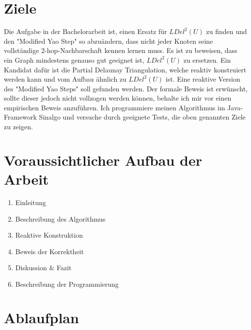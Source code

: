 \documentclass[a4paper,DIV10,10pt,headsepline,smallheadings]{scrreprt}
\begin{document}
\section{Ziele}
Die Aufgabe in der Bachelorarbeit ist, einen Ersatz für $LDel^2(U) $ zu finden und den "Modified Yao Step" so abzuändern, dass nicht jeder Knoten seine vollständige 2-hop-Nachbarschaft kennen lernen muss.
Es ist zu beweisen, dass ein Graph mindestens genauso gut geeignet ist, $LDel^2(U) $ zu ersetzen.
Ein Kandidat dafür ist die Partial Delaunay Triangulation, welche reaktiv konstruiert werden kann und vom Aufbau ähnlich zu $LDel^2(U) $ ist.
Eine reaktive Version des "Modified Yao Steps" soll gefunden werden.
Der formale Beweis ist erwünscht, sollte dieser jedoch nicht vollzogen werden können, behalte ich mir vor einen empirischen Beweis anzuführen.
Ich programmiere meinen Algorithmus im Java-Framework Sinalgo und versuche durch geeignete Tests, die oben genannten Ziele zu zeigen.

\section{Voraussichtlicher Aufbau der Arbeit}
\begin{enumerate}[topsep=0pt,itemsep=-1ex,partopsep=1ex,parsep=1ex]
\item Einleitung
\item Beschreibung des Algorithmus
\item Reaktive Konstruktion
\item Beweis der Korrektheit
\item Diskussion \& Fazit
\item Beschreibung der Programmierung
\end{enumerate}

\section{Ablaufplan}
\begin{table}[h]
\end{table}
\end{document}
